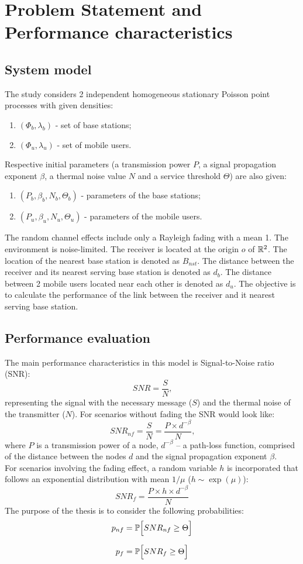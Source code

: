 \section{Problem Statement and Performance characteristics}
\subsection{System model}
The study considers 2 independent homogeneous stationary Poisson point processes with given densities:
\begin {enumerate}
  \item $(\Phi_b, \lambda_b)$ - set of base stations;
  \item $(\Phi_u, \lambda_u)$ - set of mobile users.
\end {enumerate}
Respective initial parameters (a transmission power $P$, a signal propagation exponent $\beta$, a thermal noise value $N$ and a service threshold $\Theta$) are also given:
\begin {enumerate}
  \item $(P_b, \beta_b, N_b, \Theta_b)$ - parameters of the base stations;
  \item $(P_u, \beta_u, N_u, \Theta_u)$ - parameters of the mobile users.
\end {enumerate}
The random channel effects include only a Rayleigh fading with a mean 1. 
The environment is noise-limited. 
The receiver is located at the origin $o$ of $\R^2$. 
The location of the nearest base station is denoted as $B_{nst}$. 
The distance between the receiver and its nearest serving base station is denoted as $d_b$. 
The distance between 2 mobile users located near each other is denoted as $d_u$. 
The objective is to calculate the performance of the link between the receiver and it nearest serving base station.

\subsection{Performance evaluation}
The main performance characteristics in this model is Signal-to-Noise ratio (SNR):
\[SNR=\frac {S}{N}\text{,}\]
representing the signal with the necessary message (\(S\)) and the thermal noise of the transmitter (\(N\)). 
For scenarios without fading the SNR would look like:
\[SNR_{nf}=\frac {S}{N}=\frac {P\times d^{-\beta}}{N}\text{,}\]
where \(P\) is a transmission power of a node, \(d^{-\beta}\) -- a path-loss function, comprised of the distance between the nodes \(d\) and the signal propagation exponent \(\beta\).
\\ For scenarios involving the fading effect, a random variable \(h\) is incorporated that follows an exponential distribution with mean \(1/\mu\) \Big(\(h\sim \exp(\mu)\)\Big):
\[SNR_f=\frac {P\times h\times d^{-\beta}}{N}\]
The purpose of the thesis is to consider the following probabilities:
\begin {equation}
  p_{nf}=\P\Big[SNR_{nf}\ge\Theta\Big]
\end {equation}

\begin {equation}
  p_f=\P\Big[SNR_f\ge\Theta\Big]
\end {equation}
